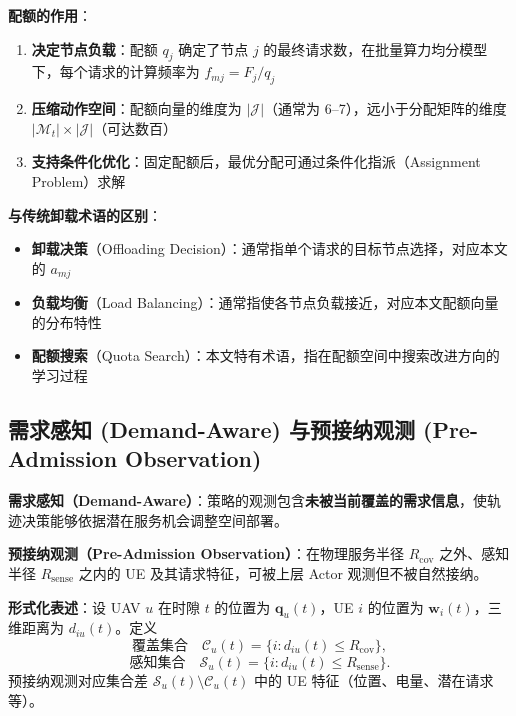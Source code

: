 \textbf{配额的作用}：
\begin{enumerate}
    \item \textbf{决定节点负载}：配额 $q_j$ 确定了节点 $j$ 的最终请求数，在批量算力均分模型下，每个请求的计算频率为 $f_{mj} = F_j / q_j$
    \item \textbf{压缩动作空间}：配额向量的维度为 $|\mathcal{J}|$（通常为 6--7），远小于分配矩阵的维度 $|\mathcal{M}_t| \times |\mathcal{J}|$（可达数百）
    \item \textbf{支持条件化优化}：固定配额后，最优分配可通过条件化指派（Assignment Problem）求解
\end{enumerate}

\textbf{与传统卸载术语的区别}：
\begin{itemize}
    \item \textbf{卸载决策}（Offloading Decision）：通常指单个请求的目标节点选择，对应本文的 $a_{mj}$
    \item \textbf{负载均衡}（Load Balancing）：通常指使各节点负载接近，对应本文配额向量的分布特性
    \item \textbf{配额搜索}（Quota Search）：本文特有术语，指在配额空间中搜索改进方向的学习过程
\end{itemize}

\subsection{需求感知 (Demand-Aware) 与预接纳观测 (Pre-Admission Observation)}
\label{sec:ch2-term-demand-aware}

\textbf{需求感知（Demand-Aware）}：策略的观测包含\textbf{未被当前覆盖的需求信息}，使轨迹决策能够依据潜在服务机会调整空间部署。

\textbf{预接纳观测（Pre-Admission Observation）}：在物理服务半径 $R_{\mathrm{cov}}$ 之外、感知半径 $R_{\mathrm{sense}}$ 之内的 UE 及其请求特征，可被上层 Actor 观测但不被自然接纳。

\textbf{形式化表述}：设 UAV $u$ 在时隙 $t$ 的位置为 $\mathbf{q}_u(t)$，UE $i$ 的位置为 $\mathbf{w}_i(t)$，三维距离为 $d_{iu}(t)$。定义
\begin{equation}
    \text{覆盖集合} \quad \mathcal{C}_u(t) = \{i : d_{iu}(t) \leq R_{\mathrm{cov}}\},
    \label{eq:ch2-term-covered}
\end{equation}
\begin{equation}
    \text{感知集合} \quad \mathcal{S}_u(t) = \{i : d_{iu}(t) \leq R_{\mathrm{sense}}\}.
    \label{eq:ch2-term-sensed}
\end{equation}
预接纳观测对应集合差 $\mathcal{S}_u(t) \setminus \mathcal{C}_u(t)$ 中的 UE 特征（位置、电量、潜在请求等）。

